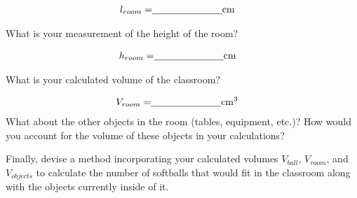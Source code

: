 \begin{questions}
\begin{align*}
l_{room} =& \underline{\hspace{2.5cm}}\SI{}{cm}
\end{align*} 

What is your measurement of the height of the room? 
\qsp

\begin{align*}
h_{room} =& \underline{\hspace{2.5cm}}\SI{}{cm}
\end{align*} 

What is your calculated volume of the classroom? 
\qsp 

\begin{align*}
V_{room} =& \underline{\hspace{2.5cm}}\SI{}{cm^3}
\end{align*} 
\question[3] What about the other objects in the room (tables, equipment, etc.)? How would you account for the volume of these objects in your calculations? 
\question[2] Finally, devise a method incorporating your calculated volumes $V_{ball}$, $V_{room}$, and $V_{objects}$ to calculate the number of softballs that would fit in the classroom along with the objects currently inside of it. 

\end{questions}

